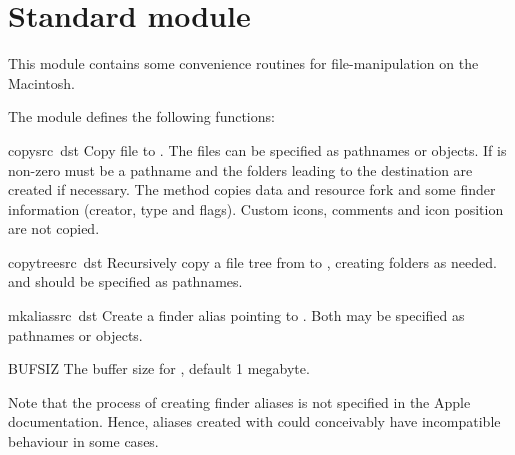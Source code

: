 
\section{Standard module }

This module contains some convenience routines for file-manipulation
on the Macintosh.

The  module defines the following functions:

\renewcommand{\indexsubitem}{(in module macostools)}

\begin{funcdesc}{copy}{src\, dst}
Copy file  to . The files can be specified as
pathnames or  objects. If  is non-zero
 must be a pathname and the folders leading to the
destination are created if necessary.
The method copies data and resource fork and some finder information
(creator, type and flags). Custom icons, comments and icon position
are not copied.
\end{funcdesc}

\begin{funcdesc}{copytree}{src\, dst}
Recursively copy a file tree from  to , creating
folders as needed.  and  should be specified as
pathnames.
\end{funcdesc}

\begin{funcdesc}{mkalias}{src\, dst}
Create a finder alias  pointing to . Both may be
specified as pathnames or  objects.
\end{funcdesc}

\begin{datadesc}{BUFSIZ}
The buffer size for , default 1 megabyte.
\end{datadesc}

Note that the process of creating finder aliases is not specified in
the Apple documentation. Hence, aliases created with 
could conceivably have incompatible behaviour in some cases.
